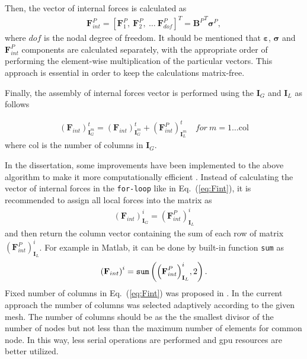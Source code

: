 Then, the vector of internal forces is calculated as
\begin{eqnarray}
	\label{eq:forces}
	\textbf{F}^P_{int}=\left[\textbf{F}^P_1,\ \textbf{F}^P_2,\ \ldots\ \textbf{F}^P_{dof} \right]^T={\textbf{B}^P}^T\boldsymbol{\sigma}^P,
\end{eqnarray}
where $dof$ is the nodal degree of freedom.
It should be mentioned that \(\boldsymbol{\varepsilon}\), \(\boldsymbol{\sigma}\) and \(\textbf{F}^P_{int}\) components are calculated separately, with the appropriate order of performing the element-wise multiplication of the particular vectors.
This approach is essential in order to keep the calculations matrix-free.

Finally, the assembly of internal forces vector is performed using the \(\textbf{I}_G\) and \(\textbf{I}_L\) as follows

\begin{eqnarray}
	\label{eq:Fint}
	{\left(\textbf{F}_{int}\right)}^t_{\textbf{I}^m_G} = {\left(\textbf{F}_{int}\right)}^t_{\textbf{I}^m_G} + {\left(\textbf{F}^P_{int}\right)}^t_{\textbf{I}^m_L}\quad for\ m=1\ldots \mathrm{col} 
\end{eqnarray}
where col is the number of columns in \(\textbf{I}_G\).

In the dissertation, some improvements have been implemented to the above algorithm to make it more computationally efficient \cite{fiborek2022spectral}.
Instead of calculating the vector of internal forces in the \verb+for-loop+ like in Eq.~(\ref{eq:Fint}), it is recommended to assign all local forces into the matrix as
\begin{eqnarray}
	\label{eq:Fmatrix}
	{\left(\textbf{F}_{int}\right)}^i_{\textbf{I}_G} ={\left(\textbf{F}^P_{int}\right)}^i_{\textbf{I}_L}
\end{eqnarray}
and then return the column vector containing the sum of each row of matrix \({\left(\textbf{F}^P_{int}\right)}^i_{\textbf{I}_L}\).
For example in Matlab, it can be done by built-in function \verb|sum| as
\begin{eqnarray}
	\label{eq:Fsum}
	{\left(\textbf{F}_{int}\right)}^i = \verb|sum| \left({\left(\textbf{F}^P_{int}\right)}^i_{\textbf{I}_L},2\right).
\end{eqnarray}
Fixed number of columns in Eq.~(\ref{eq:Fint}) was proposed in \cite{kudela2016parallel}.
In the current approach the number of columns was selected adaptively according to the given mesh.
The number of columns should be as the the smallest divisor of the number of nodes but not less than the maximum number of elements for common node.
In this way, less serial operations are performed and \ac{gpu} resources are better utilized.

